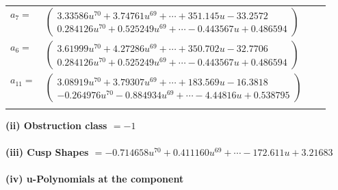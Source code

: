 \documentclass[1p]{elsarticle_modified}
\theoremstyle{definition}
\begin{document}
\begin{tabular}{m{7pt} m{180pt} m{7pt} m{180pt} }
\flushright $a_{7}=$&$\begin{pmatrix}3.33586 u^{70}+3.74761 u^{69}+\cdots+351.145 u-33.2572\\0.284126 u^{70}+0.525249 u^{69}+\cdots-0.443567 u+0.486594\end{pmatrix}$ \\
\flushright $a_{6}=$&$\begin{pmatrix}3.61999 u^{70}+4.27286 u^{69}+\cdots+350.702 u-32.7706\\0.284126 u^{70}+0.525249 u^{69}+\cdots-0.443567 u+0.486594\end{pmatrix}$ \\
\flushright $a_{11}=$&$\begin{pmatrix}3.08919 u^{70}+3.79307 u^{69}+\cdots+183.569 u-16.3818\\-0.264976 u^{70}-0.884934 u^{69}+\cdots-4.44816 u+0.538795\end{pmatrix}$\\&\end{tabular}
\flushleft \textbf{(ii) Obstruction class $= -1$}\\~\\
\flushleft \textbf{(iii) Cusp Shapes $= -0.714658 u^{70}+0.411160 u^{69}+\cdots-172.611 u+3.21683$}\\~\\
\newpage\renewcommand{\arraystretch}{1}
\flushleft \textbf{(iv) u-Polynomials at the component}\newline \\
\end{document}
